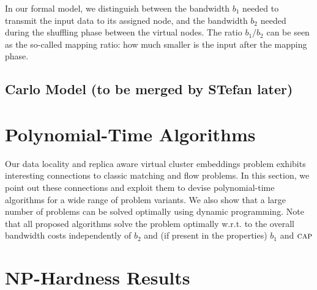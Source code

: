 \documentclass[9pt,twocolumn]{scrartcl}
\newcommand{\Capacity}{\ensuremath{\textsc{cap}}}
\newcommand{\CostCom}{\ensuremath{b_1}}
\newcommand{\CostTrans}{\ensuremath{b_2}}
\begin{document}
In our formal model, we distinguish between the bandwidth $b_1$ needed to
transmit the input data to its assigned node, and the bandwidth $b_2$
needed during the shuffling phase between the virtual nodes.
The ratio $b_1/b_2$ can be seen as the so-called mapping ratio:
how much smaller is the input after the mapping phase.



\subsection{Carlo Model (to be merged by STefan later)}


\section{Polynomial-Time Algorithms}\label{sec:poly}

Our data locality and replica aware virtual cluster embeddings
problem exhibits interesting connections to classic matching and
flow problems. In this section, we point out these connections and
exploit them to devise polynomial-time algorithms for a wide range
of problem variants. We also show that a large number of problems
can be solved optimally using dynamic programming. Note that all proposed 
algorithms solve the problem optimally w.r.t. to the overall bandwidth costs 
independently of $\CostTrans$ and (if present in the properties) $\CostCom$ and 
$\Capacity$









\section{NP-Hardness Results}\label{sec:np}


\end{document}
